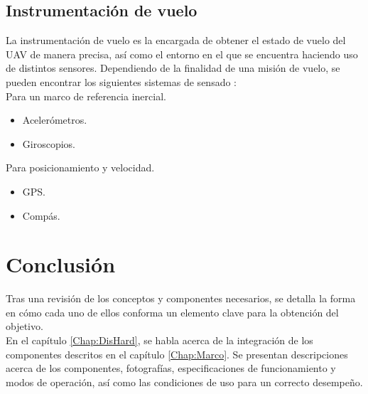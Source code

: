 \subsection{Instrumentación de vuelo}

La instrumentación de vuelo es la encargada de obtener el estado de vuelo del UAV de manera precisa, así como el entorno en el que se encuentra haciendo uso de distintos sensores. Dependiendo de la finalidad de una misión de vuelo, se pueden encontrar los siguientes sistemas de sensado \citep{barrientos2007vehiculos}:\\

Para un marco de referencia inercial.
\begin{itemize}
\item Acelerómetros.
\item Giroscopios.
\end{itemize} 

Para posicionamiento y velocidad.

\begin{itemize}
\item GPS.
\item Compás.
\end{itemize}

\section{Conclusión}

Tras una revisión de los conceptos y componentes necesarios, se detalla la forma en cómo cada uno de ellos conforma un elemento clave para la obtención del objetivo.\\

En el capítulo \ref{Chap:DisHard}, se habla acerca de la integración de los componentes descritos en el capítulo \ref{Chap:Marco}. Se presentan descripciones acerca de los componentes, fotografías, especificaciones de funcionamiento y modos de operación, así como las condiciones de uso para un correcto desempeño. 